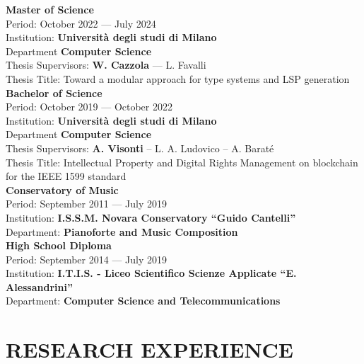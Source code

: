 \documentclass[a4paper,9pt]{extarticle}
\begin{document}
\noindent
\newline
\textbf{Master of Science} \\
Period: October 2022 --- July 2024 \\
Institution: \textbf{Universit\`a degli studi di Milano} \\
Department \textbf{Computer Science} \\
Thesis Supervisors: \textbf{W. Cazzola} --- L. Favalli \\
Thesis Title: Toward a modular approach for type systems and LSP generation \\

\noindent
\textbf{Bachelor of Science} \\
Period: October 2019 --- October 2022 \\
Institution: \textbf{Universit\`a degli studi di Milano} \\
Department \textbf{Computer Science} \\
Thesis Supervisors: \textbf{A. Visonti} -- L. A. Ludovico -- A. Barat\'e \\
Thesis Title: Intellectual Property and Digital Rights Management on blockchain for the IEEE 1599 standard \\

\noindent
\textbf{Conservatory of Music} \\
Period: September 2011 --- July 2019 \\
Institution: \textbf{I.S.S.M. Novara Conservatory ``Guido Cantelli''} \\
Department: \textbf{Pianoforte and Music Composition} \\


\noindent
\textbf{High School Diploma} \\
Period: September 2014 --- July 2019 \\
Institution: \textbf{I.T.I.S. - Liceo Scientifico Scienze Applicate ``E. Alessandrini''} \\
Department: \textbf{Computer Science and Telecommunications} \\


\section*{RESEARCH EXPERIENCE}
\end{document}
